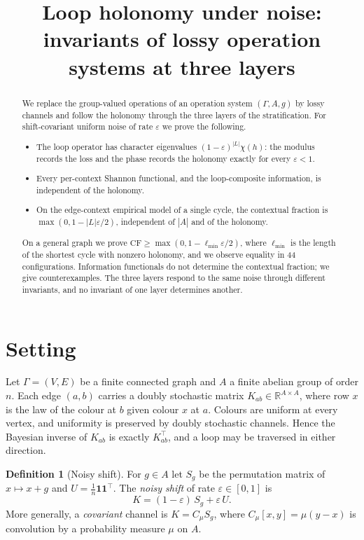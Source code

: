 \documentclass[11pt]{article}
\title{Loop holonomy under noise:\\ invariants of lossy operation systems at three layers}
\author{}
\date{}
\theoremstyle{definition}
\newtheorem{definition}[theorem]{Definition}
\theoremstyle{remark}
\newcommand{\CF}{\mathrm{CF}}
\newcommand{\lmin}{\ell_{\min}}
\newcommand{\one}{\mathbf{1}}
\begin{document}
\maketitle

\begin{abstract}
We replace the group-valued operations of an operation system $(\Gamma,A,g)$ by lossy channels and follow the holonomy through the three layers of the stratification. For shift-covariant uniform noise of rate $\varepsilon$ we prove the following.
\begin{itemize}
  \item The loop operator has character eigenvalues $(1-\varepsilon)^{|L|}\chi(h)$: the modulus records the loss and the phase records the holonomy exactly for every $\varepsilon<1$.
  \item Every per-context Shannon functional, and the loop-composite information, is independent of the holonomy.
  \item On the edge-context empirical model of a single cycle, the contextual fraction is $\max(0,1-|L|\varepsilon/2)$, independent of $|A|$ and of the holonomy.
\end{itemize}
On a general graph we prove $\CF\ge\max(0,1-\lmin\varepsilon/2)$, where $\lmin$ is the length of the shortest cycle with nonzero holonomy, and we observe equality in 44 configurations. Information functionals do not determine the contextual fraction; we give counterexamples. The three layers respond to the same noise through different invariants, and no invariant of one layer determines another.
\end{abstract}

\section{Setting}

Let $\Gamma=(V,E)$ be a finite connected graph and $A$ a finite abelian group of order $n$. Each edge $(a,b)$ carries a doubly stochastic matrix $K_{ab}\in\mathbb{R}^{A\times A}$, where row $x$ is the law of the colour at $b$ given colour $x$ at $a$. Colours are uniform at every vertex, and uniformity is preserved by doubly stochastic channels. Hence the Bayesian inverse of $K_{ab}$ is exactly $K_{ab}^{\top}$, and a loop may be traversed in either direction.

\begin{definition}[Noisy shift]
For $g\in A$ let $S_g$ be the permutation matrix of $x\mapsto x+g$ and $U=\tfrac1n\one\one^{\top}$. The \emph{noisy shift} of rate $\varepsilon\in[0,1]$ is
\[
K=(1-\varepsilon)\,S_g+\varepsilon\,U .
\]
More generally, a \emph{covariant} channel is $K=C_\mu S_g$, where $C_\mu[x,y]=\mu(y-x)$ is convolution by a probability measure $\mu$ on $A$.
\end{definition}
\end{document}
